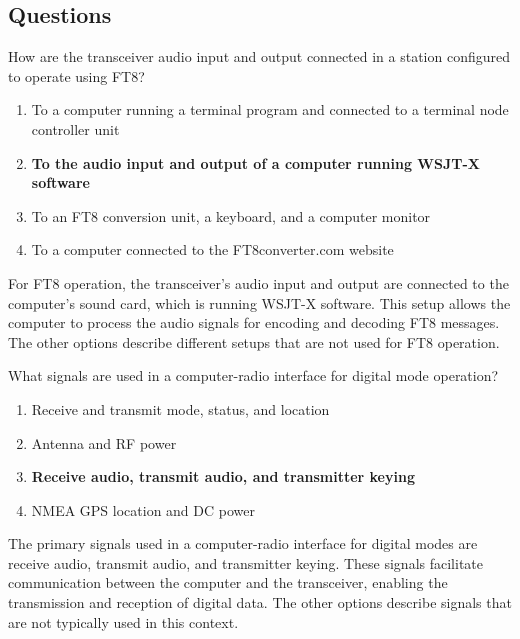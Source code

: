 \subsection*{Questions}
\begin{tcolorbox}[colback=gray!10!white,colframe=black!75!black,title={T4A04}]
    How are the transceiver audio input and output connected in a station configured to operate using FT8?
    \begin{enumerate}[label=\Alph*),noitemsep]
        \item To a computer running a terminal program and connected to a terminal node controller unit
        \item \textbf{To the audio input and output of a computer running WSJT-X software}
        \item To an FT8 conversion unit, a keyboard, and a computer monitor
        \item To a computer connected to the FT8converter.com website
    \end{enumerate}
\end{tcolorbox}
For FT8 operation, the transceiver's audio input and output are connected to the computer's sound card, which is running WSJT-X software. This setup allows the computer to process the audio signals for encoding and decoding FT8 messages. The other options describe different setups that are not used for FT8 operation.


\begin{tcolorbox}[colback=gray!10!white,colframe=black!75!black,title={T4A06}]
    What signals are used in a computer-radio interface for digital mode operation?
    \begin{enumerate}[label=\Alph*),noitemsep]
        \item Receive and transmit mode, status, and location
        \item Antenna and RF power
        \item \textbf{Receive audio, transmit audio, and transmitter keying}
        \item NMEA GPS location and DC power
    \end{enumerate}
\end{tcolorbox}
The primary signals used in a computer-radio interface for digital modes are receive audio, transmit audio, and transmitter keying. These signals facilitate communication between the computer and the transceiver, enabling the transmission and reception of digital data. The other options describe signals that are not typically used in this context.

